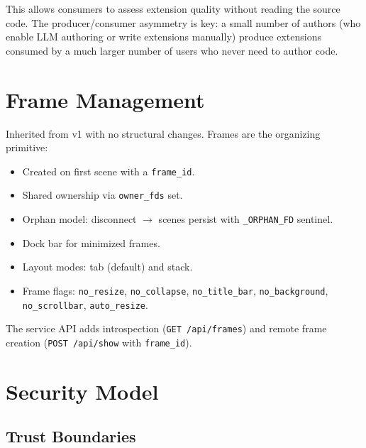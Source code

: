 \documentclass[a4paper,10pt]{article}
\newcommand{\api}[1]{\texttt{#1}}
\newcommand{\field}[1]{\texttt{#1}}
\begin{document}
This allows consumers to assess extension quality without reading
the source code.  The producer/consumer asymmetry is key: a small
number of authors (who enable LLM authoring or write extensions
manually) produce extensions consumed by a much larger number of
users who never need to author code.

\section{Frame Management}

Inherited from v1 with no structural changes.  Frames are the
organizing primitive:

\begin{itemize}[nosep]
  \item Created on first scene with a \field{frame\_id}.
  \item Shared ownership via \field{owner\_fds} set.
  \item Orphan model: disconnect $\to$ scenes persist with
    \texttt{\_ORPHAN\_FD} sentinel.
  \item Dock bar for minimized frames.
  \item Layout modes: tab (default) and stack.
  \item Frame flags: \field{no\_resize}, \field{no\_collapse},
    \field{no\_title\_bar}, \field{no\_background},
    \field{no\_scrollbar}, \field{auto\_resize}.
\end{itemize}

The service API adds introspection (\api{GET /api/frames}) and
remote frame creation (\api{POST /api/show} with
\field{frame\_id}).

\section{Security Model}

\subsection{Trust Boundaries}
\end{document}
